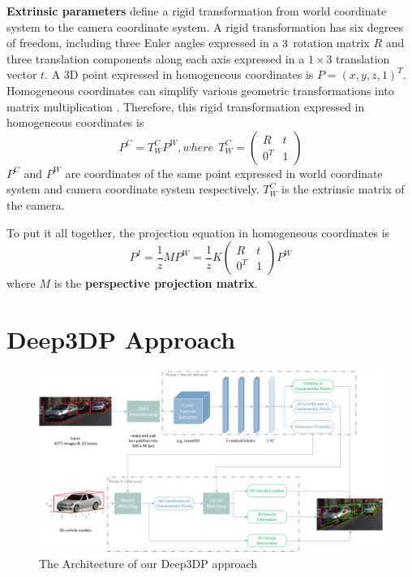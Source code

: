 \documentclass[a4paper,12pt]{article}
\begin{document}
\textbf{Extrinsic parameters} define a rigid transformation from world coordinate system to the camera coordinate system. A rigid transformation has six degrees of freedom, including three Euler angles expressed in a $3\time3$ rotation matrix $R$ and three translation components along each axis expressed in a $1\times3$ translation vector $t$. A 3D point expressed in homogeneous coordinates is $P=(x, y, z, 1)^T$. Homogeneous coordinates can simplify various geometric transformations into matrix multiplication \cite{Forsyth:2002:CVM:580035}.  Therefore, this rigid transformation expressed in homogeneous coordinates is 
\begin{equation}
\label{eq4}
P^{C} = T_W^C P^W, where ~~T_W^C = 
\begin{pmatrix}
	R & t\\ 
	0^T& 1
\end{pmatrix}
\end{equation}
$P^{C}$ and $P^W$ are coordinates of the same point expressed in world coordinate system and camera coordinate system respectively. $T_W^C$ is the extrinsic matrix of the camera.

To put it all together, the projection equation in homogeneous coordinates is 
\begin{equation}
\label{eq5}
P^I = \frac{1}{z} M P^W = \frac{1}{z} K
\begin{pmatrix}
R & t\\ 
0^T& 1
\end{pmatrix} P^W
\end{equation}
where $M$ is the \textbf{perspective projection matrix}.
\clearpage





\section{Deep3DP Approach}
\label{main_work}
\begin{figure}[h]		
	\includegraphics[width=1\textwidth]{app_archi_box_0522.png}
	\caption{The Architecture of our Deep3DP approach}
	\centering
	\label{figure:app_archi}
\end{figure}
\end{document}
